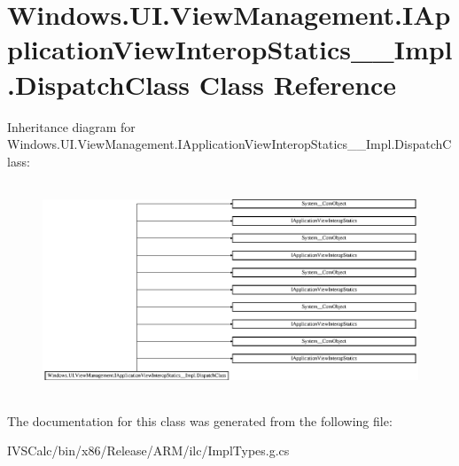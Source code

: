 \hypertarget{class_windows_1_1_u_i_1_1_view_management_1_1_i_application_view_interop_statics_____impl_1_1_dispatch_class}{}\section{Windows.\+U\+I.\+View\+Management.\+I\+Application\+View\+Interop\+Statics\+\_\+\+\_\+\+Impl.\+Dispatch\+Class Class Reference}
\label{class_windows_1_1_u_i_1_1_view_management_1_1_i_application_view_interop_statics_____impl_1_1_dispatch_class}
Inheritance diagram for Windows.\+U\+I.\+View\+Management.\+I\+Application\+View\+Interop\+Statics\+\_\+\+\_\+\+Impl.\+Dispatch\+Class\+:\begin{figure}[H]
\begin{center}
\leavevmode
\includegraphics[height=6.376812cm]{class_windows_1_1_u_i_1_1_view_management_1_1_i_application_view_interop_statics_____impl_1_1_dispatch_class}
\end{center}
\end{figure}


The documentation for this class was generated from the following file\+:\begin{DoxyCompactItemize}
\item 
I\+V\+S\+Calc/bin/x86/\+Release/\+A\+R\+M/ilc/Impl\+Types.\+g.\+cs\end{DoxyCompactItemize}
